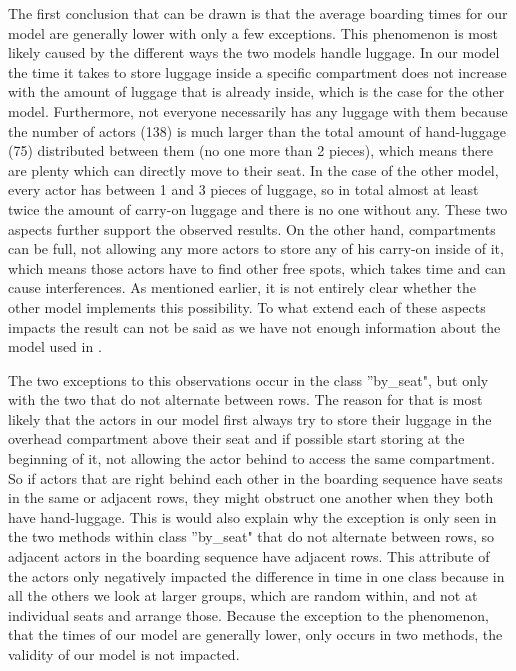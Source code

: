 \documentclass[11pt]{article}
\begin{document}
The first conclusion that can be drawn is that the average boarding times for our model are generally lower with only a few exceptions. This phenomenon is most likely caused by the different ways the two models handle luggage. In our model the time it takes to store luggage inside a specific compartment does not increase with the amount of luggage that is already inside, which is the case for the other model. Furthermore, not everyone necessarily has any luggage with them because the number of actors (138) is much larger than the total amount of hand-luggage (75) distributed between them (no one more than 2 pieces), which means there are plenty which can directly move to their seat. In the case of the other model, every actor has between 1 and 3 pieces of luggage, so in total almost at least twice the amount of carry-on luggage and there is no one without any. These two aspects further support the observed results. On the other hand, compartments can be full, not allowing any more actors to store any of his carry-on inside of it, which means those actors have to find other free spots, which takes time and can cause interferences.  As mentioned earlier, it is not entirely clear whether the other model implements this possibility. To what extend each of these aspects impacts the result can not be said as we have not enough information about the model used in \cite{beus}. 
	
The two exceptions to this observations occur in the class ''by\_seat", but only with the two that do not alternate between rows. The reason for that is most likely that the actors in our model first always try to store their luggage in the overhead compartment above their seat and if possible start storing at the beginning of it, not allowing the actor behind to access the same compartment. So if actors that are right behind each other in the boarding sequence have seats in the same or adjacent rows, they might obstruct one another when they both have hand-luggage. This is would also explain why the exception is only seen in the two methods within class ''by\_seat" that do not alternate between rows, so adjacent actors in the boarding sequence have adjacent rows. This attribute of the actors only negatively impacted the difference in time in one class because in all the others we look at larger groups, which are random within, and not at individual seats and arrange those. Because the exception to the phenomenon, that the times of our model are generally lower, only occurs in two methods, the validity of our model is not impacted. 
\end{document}
